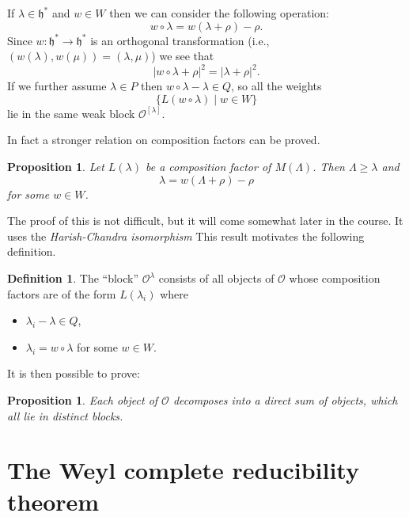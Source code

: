 \documentclass[12pt]{article}
\theoremstyle{plain}
\newtheorem{prop}[thm]{Proposition}
\theoremstyle{definition}
\newtheorem{defn}{Definition}[section]
\numberwithin{equation}{section}
\newcommand{\la}{\lambda}
\newcommand{\La}{\Lambda}
\newcommand{\h}{\mathfrak{h}}
\newcommand{\OO}{\mathcal{O}}
\begin{document}

If $\la \in \h^*$ and $w \in W$ then we can consider the following operation:
\[
w \circ \la = w(\la+\rho) - \rho.
\]
Since $w : \h^* \rightarrow \h^*$ is an orthogonal transformation (i.e., $(w(\la), w(\mu)) = (\la, \mu)$) we see that
\[
|w\circ \la + \rho|^2 = |\la+\rho|^2.
\]
If we further assume $\la \in P$ then $w\circ\la - \la \in Q$, so all the weights
\[
\{L(w \circ \la) \mid w \in W\}
\]
lie in the same weak block $\OO^{[\la]}$.



In fact a stronger relation on composition factors can be proved.
\begin{prop}\label{prop:block-condition}
Let $L(\la)$ be a composition factor of $M(\Lambda)$. Then $\La \geq \la$ and
\[
\la = w(\La+\rho) - \rho
\]
for some $w \in W$.
\end{prop}
The proof of this is not difficult, but it will come somewhat later in the course. It uses the \emph{Harish-Chandra isomorphism} This result motivates the following definition.
\begin{defn}
The ``block'' $\OO^{\la}$ consists of all objects of $\OO$ whose composition factors are of the form $L(\la_i)$ where
\begin{itemize}
\item $\la_i - \la \in Q$,

\item $\la_i = w \circ \la$ for some $w\in W$.
\end{itemize}
\end{defn}
It is then possible to prove:
\begin{prop}
Each object of $\OO$ decomposes into a direct sum of objects, which all lie in distinct blocks.
\end{prop}




\section{The Weyl complete reducibility theorem}
\end{document}
